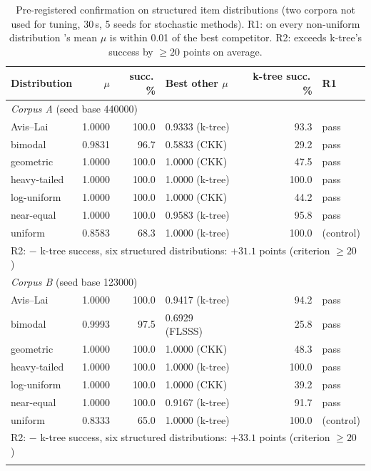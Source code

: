 \begin{table}[htbp]
\caption{Pre-registered confirmation on structured item distributions (two corpora not used for tuning, 30\,s, 5 seeds for stochastic methods). R1: on every non-uniform distribution \algname's mean $\mu$ is within 0.01 of the best competitor. R2: \algname{} exceeds k-tree's success by $\geq 20$ points on average.}
\label{tab:structured}
\begin{tabular}{lrrlrl}
\toprule
Distribution & \algname{} $\mu$ & \algname{} succ.\,\% & Best other $\mu$ & k-tree succ.\,\% & R1 \\
\midrule
\multicolumn{6}{l}{\emph{Corpus A} (seed base 440000)} \\
Avis--Lai & 1.0000 & 100.0 & 0.9333 (k-tree) & 93.3 & pass \\
bimodal & 0.9831 & 96.7 & 0.5833 (CKK) & 29.2 & pass \\
geometric & 1.0000 & 100.0 & 1.0000 (CKK) & 47.5 & pass \\
heavy-tailed & 1.0000 & 100.0 & 1.0000 (k-tree) & 100.0 & pass \\
log-uniform & 1.0000 & 100.0 & 1.0000 (CKK) & 44.2 & pass \\
near-equal & 1.0000 & 100.0 & 0.9583 (k-tree) & 95.8 & pass \\
uniform & 0.8583 & 68.3 & 1.0000 (k-tree) & 100.0 & (control) \\
\multicolumn{6}{l}{R2: \algname{} $-$ k-tree success, six structured distributions: $+31.1$ points (criterion $\geq 20$)} \\
\midrule
\multicolumn{6}{l}{\emph{Corpus B} (seed base 123000)} \\
Avis--Lai & 1.0000 & 100.0 & 0.9417 (k-tree) & 94.2 & pass \\
bimodal & 0.9993 & 97.5 & 0.6929 (FLSSS) & 25.8 & pass \\
geometric & 1.0000 & 100.0 & 1.0000 (CKK) & 48.3 & pass \\
heavy-tailed & 1.0000 & 100.0 & 1.0000 (k-tree) & 100.0 & pass \\
log-uniform & 1.0000 & 100.0 & 1.0000 (CKK) & 39.2 & pass \\
near-equal & 1.0000 & 100.0 & 0.9167 (k-tree) & 91.7 & pass \\
uniform & 0.8333 & 65.0 & 1.0000 (k-tree) & 100.0 & (control) \\
\multicolumn{6}{l}{R2: \algname{} $-$ k-tree success, six structured distributions: $+33.1$ points (criterion $\geq 20$)} \\
\botrule
\end{tabular}
\end{table}
